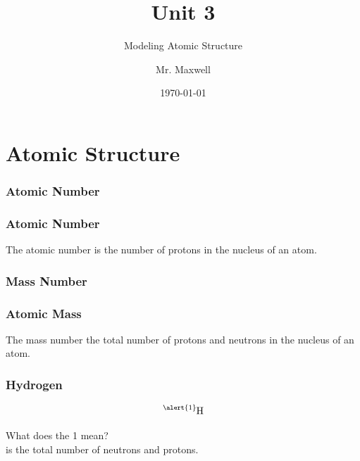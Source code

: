 \documentclass{beamer}
\title{Unit 3}
\subtitle{Modeling Atomic Structure}
\author{Mr. Maxwell}
\institute{PACS}
\date{\today}
\begin{document}
\frame{\titlepage}
\frame{\tableofcontents}

\section{Atomic Structure}


\subsubsection{Atomic Number}

\begin{frame}
    \frametitle{Atomic Number}
\onslide The 
 \pause \alert{atomic number}
 \onslide is the number of 
 \pause \alert{protons} 
 \onslide in the nucleus of an atom.
\end{frame}


\subsubsection{Mass Number}
\begin{frame}
    \frametitle{Atomic Mass}
    \onslide The 
     \pause \alert{mass number}
     \onslide the total number of
     \pause \alert{protons} 
     \onslide and
     \pause \alert{neutrons} 
     \onslide in the nucleus of an atom.
    \end{frame}



\begin{frame}
    \frametitle{Hydrogen}
    $$\ce{^{\alert{1}}_{}H}$$

    \pause What does the \alert{1} mean?\\

     is the total number of neutrons and protons.

    \vspace{1cm}



\end{frame}
\end{document}
